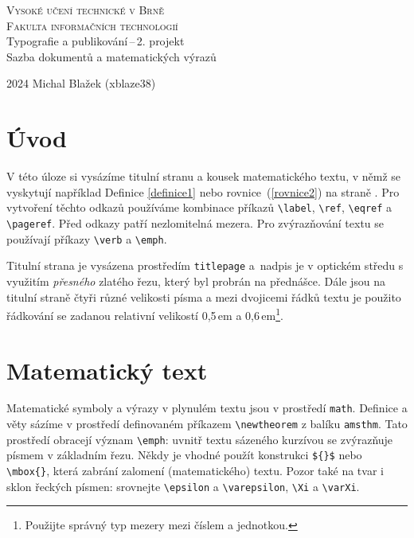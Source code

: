 \documentclass[a4paper, twocolumn, 11pt]{article}
\begin{document}
\begin{titlepage}
\begin{center}
    \Huge
    \textsc{Vysoké učení technické v Brně\\
    \huge{Fakulta informačních technologií}}\\
    \LARGE{Typografie a publikování\,--\,2. projekt\\
    Sazba dokumentů a matematických výrazů}\\
\end{center}
{\Large 2024 \hfill Michal Blažek (xblaze38)}
\end{titlepage}

\section*{Úvod}

V této úloze si vysázíme titulní stranu a kousek matematického textu, v němž se vyskytují například Definice \ref{definice1} nebo rovnice~(\ref{rovnice2}) na straně \pageref{rovnice2}. Pro vytvoření těchto odkazů používáme kombinace příkazů \verb|\label|, \verb|\ref|, \verb|\eqref| a \verb|\pageref|. Před odkazy patří nezlomitelná mezera. Pro zvýrazňování textu se používají příkazy \verb|\verb| a \verb|\emph|.

Titulní strana je vysázena prostředím \texttt{titlepage} a~nadpis je v optickém středu s využitím \emph{přesného} zlatého řezu, který byl probrán na přednášce. Dále jsou na titulní straně čtyři různé velikosti písma a mezi dvojicemi řádků textu je použito řádkování se zadanou relativní velikostí 0,5\,em a 0,6\,em\footnote{Použijte správný typ mezery mezi číslem a jednotkou.}.

\section{Matematický text}

Matematické symboly a výrazy v plynulém textu jsou v prostředí \texttt{math}. Definice a věty sázíme v prostředí definovaném příkazem \verb|\newtheorem| z balíku \texttt{amsthm}. Tato prostředí obracejí význam \verb|\emph|: uvnitř textu sázeného kurzívou se zvýrazňuje písmem v základním řezu. Někdy je vhodné použít konstrukci \verb|${}$| nebo \verb|\mbox{}|, která zabrání zalomení (matematického) textu. Pozor také na tvar i sklon řeckých písmen: srovnejte \verb|\epsilon| a \verb|\varepsilon|, \verb|\Xi| a \verb|\varXi|.
\end{document}
